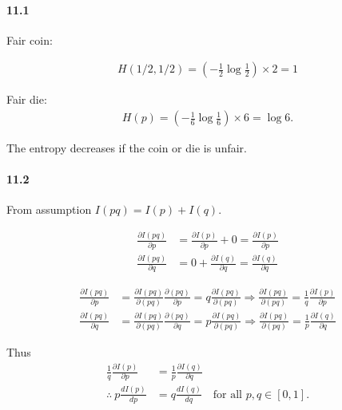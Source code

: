\paragraph{11.1}
Fair coin:

\begin{align}
    H({1/2, 1/2}) = \left( - \frac{1}{2} \log \frac{1}{2} \right) \times 2 = 1
\end{align}


Fair die:
\begin{align}
    H(p) = \left( - \frac{1}{6} \log \frac{1}{6} \right) \times 6 = \log 6.
\end{align}


The entropy decreases if the coin or die is unfair.



\paragraph{11.2}

From assumption $I(pq) = I(p) + I(q)$.

\begin{align}
    \frac{\partial I(pq)}{\partial p} &= \frac{\partial I(p)}{\partial p} + 0 = \frac{\partial I(p)}{\partial p}\\
    \frac{\partial I(pq)}{\partial q} &= 0 + \frac{\partial I(q)}{\partial q} = \frac{\partial I(q)}{\partial q}
\end{align}


\begin{align}
    \frac{\partial I(pq)}{\partial p}
        &=  \frac{\partial I(pq)}{\partial (pq)} \frac{\partial (pq)}{\partial p}
        = q \frac{\partial I(pq)}{\partial(pq)}
    \Rightarrow \frac{\partial I(pq)}{\partial(pq)} = \frac{1}{q} \frac{\partial I(p)}{\partial p}\\
%
    \frac{\partial I(pq)}{\partial q}
        &=  \frac{\partial I(pq)}{\partial (pq)} \frac{\partial (pq)}{\partial q}
        = p \frac{\partial I(pq)}{\partial(pq)}
    \Rightarrow \frac{\partial I(pq)}{\partial(pq)} = \frac{1}{p} \frac{\partial I(q)}{\partial q}
\end{align}

Thus
\begin{align}
    \frac{1}{q} \frac{\partial I(p)}{\partial p} &= \frac{1}{p} \frac{\partial I(q)}{\partial q}\\
    \therefore~ p \frac{d I(p)}{d p} &= q \frac{d I(q)}{d q} ~~~\text{ for all } p,q \in [0,1].\\
\end{align}

